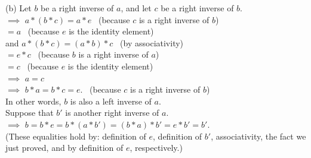 \documentclass[
  12pt,
  a4paper,
  twoside]{article}
\theoremstyle{plain}
\theoremstyle{definition}
\begin{document}
\(\)(b) Let \(b\) be a right inverse of \(a\), and let \(c\) be a right inverse of \(b\).\\
\(\implies\) \(a*(b*c) = a*e\) \hfill~{(because \(c\) is a right inverse of \(b\))}\\
\hspace*{0.333em}\hspace*{0.333em}\hspace*{0.333em}\hspace*{0.333em}\hspace*{0.333em}\hspace*{0.333em}\hspace*{0.333em}\hspace*{0.333em}\hspace*{0.333em} \(= a\) \hfill~{(because \(e\) is the identity element)}\\
\hspace*{0.333em}\hspace*{0.333em}\hspace*{0.333em}and \(a*(b*c) = (a*b)*c\) \hfill~{(by associativity)}\\
\hspace*{0.333em}\hspace*{0.333em}\hspace*{0.333em}\hspace*{0.333em}\hspace*{0.333em}\hspace*{0.333em}\hspace*{0.333em}\hspace*{0.333em}\hspace*{0.333em} \(= e*c\) \hfill~{(because \(b\) is a right inverse of \(a\))}\\
\hspace*{0.333em}\hspace*{0.333em}\hspace*{0.333em}\hspace*{0.333em}\hspace*{0.333em}\hspace*{0.333em}\hspace*{0.333em}\hspace*{0.333em}\hspace*{0.333em} \(= c\) \hfill~{(because \(e\) is the identity element)}\\
\(\implies\) \(a=c\)\\
\(\implies\) \(b*a = b*c = e\). \hfill~{(because \(c\) is a right inverse of \(b\))}\\
In other words, \(b\) is also a left inverse of \(a\).\\
Suppose that \(b'\) is another right inverse of \(a\).\\
\(\implies\) \(b=b*e=b*(a*b')=(b*a)*b' = e*b' = b'\).\\
(These equalities hold by: definition of \(e\), definition of \(b'\), associativity, the fact we just proved, and by definition of \(e\), respectively.)
\end{document}
